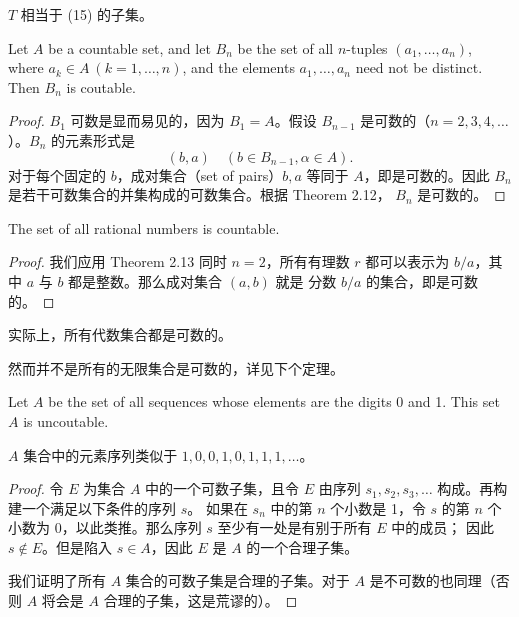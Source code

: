 \documentclass[../poma-notes.tex]{subfiles}
\begin{document}
$T$ 相当于 (15) 的子集。

\begin{theorem}
  Let $A$ be a countable set, and let $B_n$ be the set of all $n$-tuples $(a_1,\dots,a_n)$, where
  $a_k \in A \ (k=1,\dots,n)$, and the elements $a_1,\dots,a_n$ need not be distinct. Then $B_n$ is coutable.
\end{theorem}

\begin{proof}
  $B_1$ 可数是显而易见的，因为 $B_1=A$。假设 $B_{n-1}$ 是可数的（$n=2,3,4,\dots$）。$B_n$ 的元素形式是
  \begin{equation}
    (b,a) \quad (b \in B_{n-1}, \alpha \in A).
  \end{equation}
  对于每个固定的 $b$，成对集合（set of pairs）$b, a$ 等同于 $A$，即是可数的。因此 $B_n$ 是若干可数集合的并集构成的可数集合。根据 Theorem 2.12，
  $B_n$ 是可数的。
\end{proof}

\begin{corollary}
  The set of all rational numbers is countable.
\end{corollary}

\begin{proof}
  我们应用 Theorem 2.13 同时 $n=2$，所有有理数 $r$ 都可以表示为 $b/a$，其中 $a$ 与 $b$ 都是整数。那么成对集合 $(a, b)$ 就是
  分数 $b/a$ 的集合，即是可数的。
\end{proof}

实际上，所有代数集合都是可数的。

然而并不是所有的无限集合是可数的，详见下个定理。

\begin{theorem}
  Let $A$ be the set of all sequences whose elements are the digits 0 and 1. This set $A$ is uncoutable.
\end{theorem}

$A$ 集合中的元素序列类似于 $1, 0, 0, 1, 0, 1, 1, 1, \dots$。

\begin{proof}
  令 $E$ 为集合 $A$ 中的一个可数子集，且令 $E$ 由序列 $s_1, s_2, s_3, \dots$ 构成。再构建一个满足以下条件的序列 $s$。
  如果在 $s_n$ 中的第 $n$ 个小数是 1，令 $s$ 的第 $n$ 个小数为 0，以此类推。那么序列 $s$ 至少有一处是有别于所有 $E$ 中的成员；
  因此 $s \notin E$。但是陷入 $s \in A$，因此 $E$ 是 $A$ 的一个合理子集。

  我们证明了所有 $A$ 集合的可数子集是合理的子集。对于 $A$ 是不可数的也同理（否则 $A$ 将会是 $A$ 合理的子集，这是荒谬的）。
\end{proof}
\end{document}
